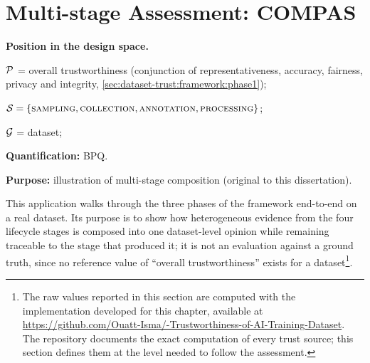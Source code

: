 \FloatBarrier

\section{Multi-stage Assessment: COMPAS}
\label{sec:dataset-trust:applications:compas}
\begin{mdframed}[backgroundcolor=blue!4, linewidth=0pt]
\textbf{Position in the design space.}

$\mathcal{P}$ = overall trustworthiness (conjunction of representativeness, accuracy, fairness, privacy and integrity, \cref{sec:dataset-trust:framework:phase1});\

$\mathcal{S} = \{\textsc{sampling}, \textsc{collection}, \textsc{annotation},
        \textsc{processing}\}$;\

$\mathcal{G}$ = dataset;\

\textbf{Quantification:} \ac{BPQ}.

\textbf{Purpose:} illustration of multi-stage composition (original to this dissertation).
\end{mdframed}

This application walks through the three phases of the framework end-to-end on a real dataset. Its purpose is to show how heterogeneous evidence from the four lifecycle stages is composed into one dataset-level opinion while remaining traceable to the stage that produced it; it is not an evaluation against a ground truth, since no reference value of ``overall trustworthiness'' exists for a dataset\footnote{The raw values reported in this section are computed with the implementation developed for this chapter, available at \url{https://github.com/Ouatt-Isma/-Trustworthiness-of-AI-Training-Dataset}. The repository documents the exact computation of every trust source; this section defines them at the level needed to follow the assessment.}.

